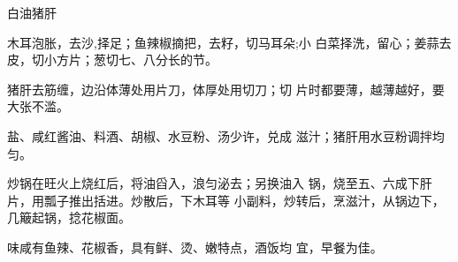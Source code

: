 \begin{recipe}{白油猪肝}

\ingredients


\cooking

\step 木耳泡胀，去沙,择足；鱼辣椒摘把，去籽，切马耳朵;小 白菜择洗，留心；姜蒜去皮，切小方片；葱切七、八分长的节。

\step 猪肝去筋缠，边沿体薄处用片刀，体厚处用切刀；切 片时都要薄，越薄越好，要大张不滥。

\step 盐、咸红酱油、料酒、胡椒、水豆粉、汤少许，兑成 滋汁；猪肝用水豆粉调拌均匀。

\step 炒锅在旺火上烧红后，将油舀入，浪匀泌去；另换油入 锅，烧至五、六成下肝片，用瓢子推出括进。炒散后，下木耳等 小副料，炒转后，烹滋汁，从锅边下，几簸起锅，捻花椒面。

\notes

味咸有鱼辣、花椒香，具有鲜、烫、嫩特点，酒饭均 宜，早餐为佳。

\end{recipe}

